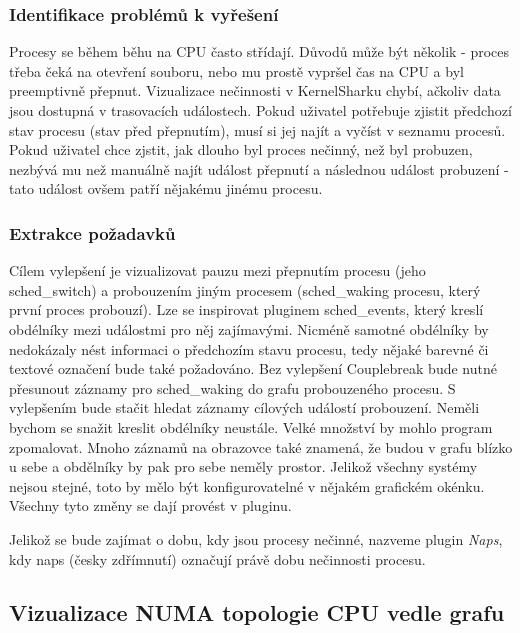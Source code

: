 \subsubsection*{Identifikace problémů k vyřešení}
Procesy se během běhu na CPU často střídají. Důvodů může být několik - proces třeba čeká na otevření souboru, nebo mu prostě vypršel čas na CPU a byl preemptivně přepnut. Vizualizace nečinnosti v KernelSharku chybí, ačkoliv data jsou dostupná v trasovacích událostech. Pokud uživatel potřebuje zjistit předchozí stav procesu (stav před přepnutím), musí si jej najít a vyčíst v seznamu procesů. Pokud uživatel chce zjstit, jak dlouho byl proces nečinný, než byl probuzen, nezbývá mu než manuálně najít událost přepnutí a následnou událost probuzení - tato událost ovšem patří nějakému jinému procesu.

\subsubsection*{Extrakce požadavků}
Cílem vylepšení je vizualizovat pauzu mezi přepnutím procesu (jeho sched\_switch) a probouzením jiným procesem (sched\_waking procesu, který první proces probouzí). Lze se inspirovat pluginem sched\_events, který kreslí obdélníky mezi událostmi pro něj zajímavými. Nicméně samotné obdélníky by nedokázaly nést informaci o předchozím stavu procesu, tedy nějaké barevné či textové označení bude také požadováno. Bez vylepšení Couplebreak bude nutné přesunout záznamy pro sched\_waking do grafu probouzeného procesu. S vylepšením bude stačit hledat záznamy cílových událostí probouzení. Neměli bychom se snažit kreslit obdélníky neustále. Velké množství by mohlo program zpomalovat. Mnoho záznamů na obrazovce také znamená, že budou v grafu blízko u sebe a obdělníky by pak pro sebe neměly prostor. Jelikož všechny systémy nejsou stejné, toto by mělo být konfigurovatelné v nějakém grafickém okénku. Všechny tyto změny se dají provést v pluginu.

Jelikož se bude zajímat o dobu, kdy jsou procesy nečinné, nazveme plugin \emph{Naps}, kdy naps (česky zdřímnutí) označují právě dobu nečinnosti procesu.

\subsection{Vizualizace NUMA topologie CPU vedle grafu}

